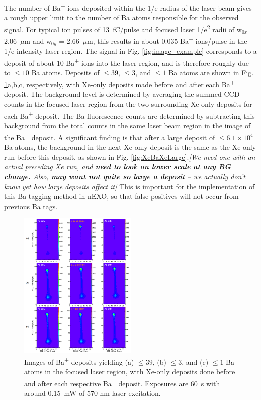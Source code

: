 \documentclass[aps,pra,reprint,superscriptaddress]{revtex4-1}
\begin{document}
The number of Ba\textsuperscript{+} ions deposited within the 1/e radius of the laser beam gives a rough upper limit to the number of Ba atoms responsible for the observed signal.  For typical ion pulses of 13~fC/pulse and focused laser 1/e\textsuperscript{2} radii of w$_{0x}$ = 2.06~$\mu$m and w$_{0y}$ = 2.66~$\mu$m, this results in about 0.035 Ba\textsuperscript{+} ions/pulse in the 1/e intensity laser region.  The signal in Fig. \ref{fig:image_example} corresponds to a deposit of about 10 Ba\textsuperscript{+} ions into the laser region, and is therefore roughly due to $\leq 10$ Ba atoms.  Deposits of $\leq 39$, $\leq 3$, and $\leq 1$ Ba atoms are shown in Fig. \ref{fig:XeBaXe}a,b,c, respectively, with Xe-only deposits made before and after each Ba\textsuperscript{+} deposit.  The background level is determined by averaging the summed CCD counts in the focused laser region from the two surrounding Xe-only deposits for each Ba\textsuperscript{+} deposit.  The Ba fluorescence counts are determined by subtracting this background from the total counts in the same laser beam region in the image of the Ba\textsuperscript{+} deposit.  A significant finding is that {\color{gray}after a large deposit of $\leq 6.1 \times 10^4$ Ba atoms, the background in the next Xe-only deposit is the same as the Xe-only run before this deposit, as shown in Fig. \ref{fig:XeBaXeLarge}.\emph{[We need one with an actual preceding Xe run, and \textbf{need to look on lower scale at any BG change.} Also, \textbf{may want not quite so large a deposit} -- we actually don't know yet how large deposits affect it]}}  This is important for the implementation of this Ba tagging method in nEXO, so that false positives will not occur from previous Ba tags.

\begin{figure}
\includegraphics[width=0.5\textwidth]{figures/xebaxe_instantaneous_scrunched.png}
\caption{Images of Ba\textsuperscript{+} deposits yielding (a) $\leq 39$, (b) $\leq 3$, and (c) $\leq 1$ Ba atoms in the focused laser region, with Xe-only deposits done before and after each respective Ba\textsuperscript{+} deposit.  Exposures are 60~s with around 0.15~mW of 570-nm laser excitation.}
\label{fig:XeBaXe}
\end{figure}
\end{document}
